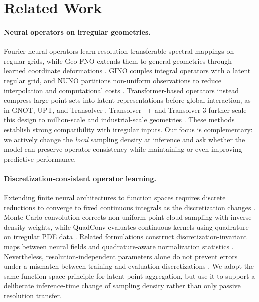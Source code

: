 \section{Related Work}
\paragraph{Neural operators on irregular geometries.}
Fourier neural operators learn resolution-transferable spectral mappings on
regular grids, while Geo-FNO extends them to general geometries through learned
coordinate deformations \citep{li2021fno,li2023geofno}. GINO couples integral
operators with a latent regular grid, and NUNO partitions non-uniform
observations to reduce interpolation and computational costs
\citep{li2023gino,liu2023nuno}. Transformer-based operators instead compress
large point sets into latent representations before global interaction, as in
GNOT, UPT, and Transolver \citep{hao2023gnot,alkin2024upt,wu2024transolver}.
Transolver++ and Transolver-3 further scale this design to million-scale and
industrial-scale geometries \citep{luo2025transolverpp,zhou2026transolver3}.
These methods establish strong compatibility with irregular inputs. Our focus is complementary: we actively change the \emph{local} sampling density at inference and ask whether the model can preserve operator consistency while maintaining or even improving predictive performance.
\vspace{-1em}
\paragraph{Discretization-consistent operator learning.}
Extending finite neural architectures to function spaces requires discrete
reductions to converge to fixed continuous integrals as the discretization
changes \citep{berner2026functionspaces}. Monte Carlo convolution corrects
non-uniform point-cloud sampling with inverse-density weights, while QuadConv
evaluates continuous kernels using quadrature on irregular PDE data
\citep{hermosilla2018montecarlo,doherty2024quadconv}. Related formulations
construct discretization-invariant maps between neural fields and
quadrature-aware normalization statistics \citep{wang2022din,kim2026quadnorm}.
Nevertheless, resolution-independent parameters alone do not prevent errors
under a mismatch between training and evaluation discretizations
\citep{gao2025discretization}. We adopt the same function-space principle for
latent point aggregation, but use it to support a deliberate inference-time
change of sampling density rather than only passive resolution transfer.
\vspace{-1em}
